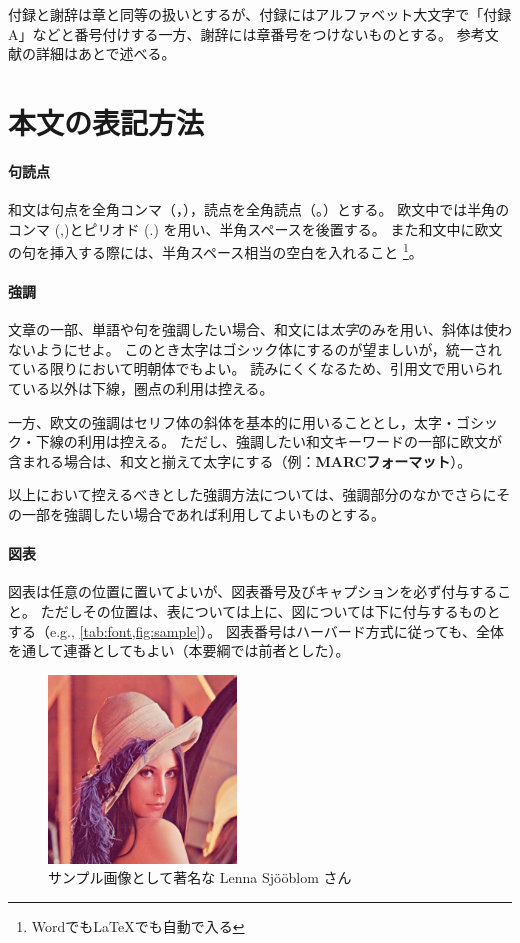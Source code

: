 		付録と謝辞は章と同等の扱いとするが、付録にはアルファベット大文字で「付録A」などと番号付けする一方、謝辞には章番号をつけないものとする。
		参考文献の詳細はあとで述べる。

	\section{本文の表記方法}
		\label{sec:writing_manner}

		\paragraph{句読点}
			\label{par:punct}

			和文は句点を全角コンマ（，），読点を全角読点（。）とする。
			欧文中では半角のコンマ (,)とピリオド (.) を用い、半角スペースを後置する。
			また和文中に欧文の句を挿入する際には、半角スペース相当の空白を入れること
			\footnote{WordでもLaTeXでも自動で入る}。

		\paragraph{強調}
			\label{par:inline_markup}

			文章の一部、単語や句を強調したい場合、和文には\emph{太字}のみを用い、斜体は使わないようにせよ。
			このとき太字はゴシック体にするのが望ましいが，統一されている限りにおいて明朝体でもよい。
			読みにくくなるため、引用文で用いられている以外は下線，圏点の利用は控える。

			一方、欧文の強調はセリフ体の斜体を基本的に用いることとし，太字・ゴシック・下線の利用は控える。
			ただし、強調したい和文キーワードの一部に欧文が含まれる場合は、和文と揃えて太字にする（例：\textbf{MARCフォーマット}）。

			以上において控えるべきとした強調方法については、強調部分のなかでさらにその一部を強調したい場合であれば利用してよいものとする。

		\paragraph{図表}
			\label{par:fig_tab}

			図表は任意の位置に置いてよいが、図表番号及びキャプションを必ず付与すること。
			ただしその位置は、表については上に、図については下に付与するものとする（e.g., \cref{tab:font,fig:sample}）。
			図表番号はハーバード方式に従っても、全体を通して連番としてもよい（本要綱では前者とした）。

			\begin{figure}[tb]
				\centering
				\includegraphics[width=5cm]{figure/Lenna.png}
				\caption{サンプル画像として著名な Lenna Sjööblom さん}
				\label{fig:sample}
			\end{figure}

